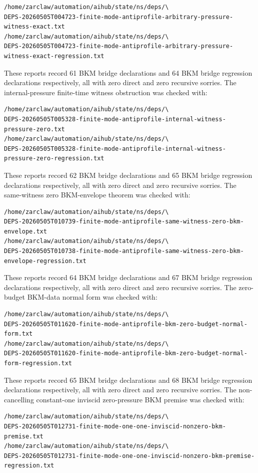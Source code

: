\documentclass[11pt]{article}
\begin{document}
\begin{verbatim}
/home/zarclaw/automation/aihub/state/ns/deps/\
DEPS-20260505T004723-finite-mode-antiprofile-arbitrary-pressure-witness-exact.txt
/home/zarclaw/automation/aihub/state/ns/deps/\
DEPS-20260505T004723-finite-mode-antiprofile-arbitrary-pressure-witness-exact-regression.txt
\end{verbatim}
These reports record 61 BKM bridge declarations and 64 BKM bridge regression
declarations respectively, all with zero direct and zero recursive sorries.
The internal-pressure finite-time witness obstruction was checked with:
\begin{verbatim}
/home/zarclaw/automation/aihub/state/ns/deps/\
DEPS-20260505T005328-finite-mode-antiprofile-internal-witness-pressure-zero.txt
/home/zarclaw/automation/aihub/state/ns/deps/\
DEPS-20260505T005328-finite-mode-antiprofile-internal-witness-pressure-zero-regression.txt
\end{verbatim}
These reports record 62 BKM bridge declarations and 65 BKM bridge regression
declarations respectively, all with zero direct and zero recursive sorries.
The same-witness zero BKM-envelope theorem was checked with:
\begin{verbatim}
/home/zarclaw/automation/aihub/state/ns/deps/\
DEPS-20260505T010739-finite-mode-antiprofile-same-witness-zero-bkm-envelope.txt
/home/zarclaw/automation/aihub/state/ns/deps/\
DEPS-20260505T010738-finite-mode-antiprofile-same-witness-zero-bkm-envelope-regression.txt
\end{verbatim}
These reports record 64 BKM bridge declarations and 67 BKM bridge regression
declarations respectively, all with zero direct and zero recursive sorries.
The zero-budget BKM-data normal form was checked with:
\begin{verbatim}
/home/zarclaw/automation/aihub/state/ns/deps/\
DEPS-20260505T011620-finite-mode-antiprofile-bkm-zero-budget-normal-form.txt
/home/zarclaw/automation/aihub/state/ns/deps/\
DEPS-20260505T011620-finite-mode-antiprofile-bkm-zero-budget-normal-form-regression.txt
\end{verbatim}
These reports record 65 BKM bridge declarations and 68 BKM bridge regression
declarations respectively, all with zero direct and zero recursive sorries.
The non-cancelling constant-one inviscid zero-pressure BKM premise was checked
with:
\begin{verbatim}
/home/zarclaw/automation/aihub/state/ns/deps/\
DEPS-20260505T012731-finite-mode-one-one-inviscid-nonzero-bkm-premise.txt
/home/zarclaw/automation/aihub/state/ns/deps/\
DEPS-20260505T012731-finite-mode-one-one-inviscid-nonzero-bkm-premise-regression.txt
\end{verbatim}
\end{document}
